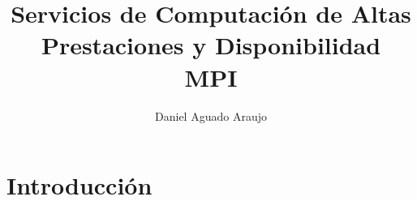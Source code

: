 \newpage \documentclass[a4paper,10pt]{article}
\title{Servicios de Computación de Altas Prestaciones y Disponibilidad \\
MPI}
\author{Daniel Aguado Araujo}
\begin{document}
\maketitle

\newpage

\tableofcontents

\newpage

\section{Introducción}

\end{document}
